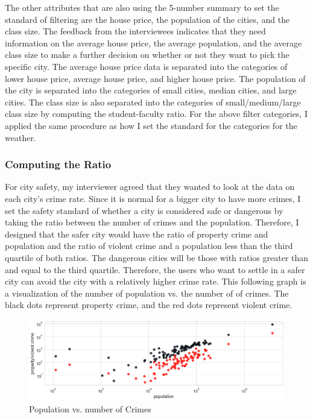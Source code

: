 \documentclass[10pt,twocolumn]{article}
\begin{document}
\newline
\indent
The other attributes that are also using the 5-number summary to set the standard of filtering are the house price, the population of the cities, and the class size. The feedback from the interviewees indicates that they need information on the average house price, the average population, and the average class size to make a further decision on whether or not they want to pick the specific city. The average house price data is separated into the categories of lower house price, average house price, and higher house price. The population of the city is separated into the categories of small cities, median cities, and large cities. The class size is also separated into the categories of small/medium/large class size by computing the student-faculty ratio. For the above filter categories, I applied the same procedure as how I set the standard for the categories for the weather. 

\subsubsection{Computing the Ratio}
For city safety, my interviewer agreed that they wanted to look at the data on each city's crime rate. Since it is normal for a bigger city to have more crimes, I set the safety standard of whether a city is considered safe or dangerous by taking the ratio between the number of crimes and the population. Therefore, I designed that the safer city would have the ratio of property crime and population and the ratio of violent crime and a population less than the third quartile of both ratios. The dangerous cities will be those with ratios greater than and equal to the third quartile. Therefore, the users who want to settle in a safer city can avoid the city with a relatively higher crime rate. This following graph is a visualization of the number of population vs. the number of of crimes. The black dots represent property crime, and the red dots represent violent crime.
\begin{figure}[h]
    \centering
    \includegraphics[width=.95\linewidth]{crimerate.png}
    \small
    \caption{Population vs. number of Crimes}
\end{figure}
\end{document}
